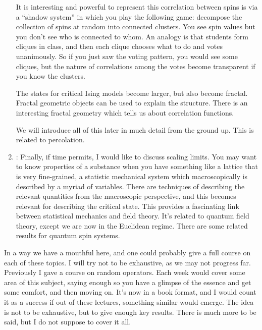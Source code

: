 \begin{enumerate}
It is interesting and powerful to represent this correlation between spins is via a ``shadow system'' in which you play the following game: decompose the collection of spins at random into connected clusters. You see spin values but you don't see who is connected to whom. %
An analogy is that students form cliques in class, and then each clique chooses what to do and votes unanimously. So if you just saw the voting pattern, you would see some cliques, but the nature of correlations among the votes become transparent if you know the clusters. 

The states for critical Ising models become larger, but also become fractal. Fractal geometric objects can be used to explain the structure. There is an interesting fractal geometry which tells us about correlation functions.

We will introduce all of this later in much detail from the ground up. This is related to percolation.

\item {}: Finally, if time permits, I would like to discuss scaling limits. You may want to know properties of a substance when you have something like a lattice that is very fine-grained, a statistic mechanical system which macroscopically is described by a myriad of variables. There are techniques of describing the relevant quantities from the macroscopic perspective, and this becomes relevant for describing the critical state. This provides a fascinating link between statistical mechanics and field theory. It's related to quantum field theory, except we are now in the Euclidean regime. There are some related results for quantum spin systems. 


\end{enumerate}

In a way we have a mouthful here, and one could probably give a full course on each of these topics. I will try not to be exhaustive, as we may not progress far. Previously I gave a course on random operators. Each week would cover some area of this subject, saying enough so you have a glimpse of the essence and get some comfort, and then moving on. It's now in a book format, and I would count it as a success if out of these lectures, something similar would emerge. The idea is not to be exhaustive, but to give enough key results. There is much more to be said, but I do not suppose to cover it all.


